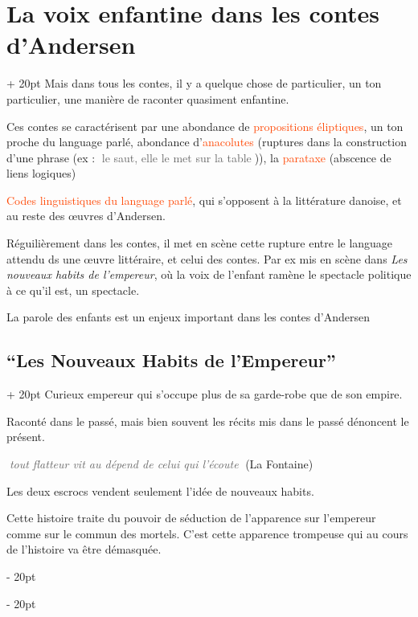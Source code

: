 \documentclass[a4paper, 12pt, twoside]{article}
\renewcommand{\emph}{\textcolor{ff4500}}
\newcommand{\simplecit}[1]{\guillemotleft$\;$#1$\;$\guillemotright}
\newcommand{\cit}[1]{\simplecit{\textcolor{656565}{#1}}}
\newcommand{\quo}[1]{\cit{\it #1}}
\newcommand{\ind}[1][20pt]{\advance\leftskip + #1}
\newcommand{\deind}[1][20pt]{\advance\leftskip - #1}
\newenvironment{indt}[2][20pt]{#2 \par \ind[#1]}{\par \deind} %
\begin{document}
\begin{indt}{\section{La voix enfantine dans les contes d'Andersen}}
        Mais dans tous les contes, il y a quelque chose de particulier, un ton particulier, une manière de raconter quasiment enfantine.
        
        Ces contes se caractérisent par une abondance de \emph{propositions éliptiques}, un ton proche du language parlé, abondance d'\emph{anacolutes} (ruptures dans la construction d'une phrase (ex : \cit{le saut, elle le met sur la table})), la \emph{parataxe} (abscence de liens logiques)
        
        \emph{Codes linguistiques du language parlé}, qui s'opposent à la littérature danoise, et au reste des \oe uvres d'Andersen.
        
        
        Réguilièrement dans les contes, il met en scène cette rupture entre le language attendu ds une \oe uvre littéraire, et celui des contes.
        Par ex mis en scène dans \textit{Les nouveaux habits de l'empereur}, où la voix de l'enfant ramène le spectacle politique à ce qu'il est, un spectacle.
        
        La parole des enfants est un enjeux important dans les contes d'Andersen
        
        \vspace{12pt}
        
        \begin{indt}{\subsection{``Les Nouveaux Habits de l'Empereur''}}
            Curieux empereur qui s'occupe plus de sa garde-robe que de son empire.
            
            Raconté dans le passé, mais bien souvent les récits mis dans le passé dénoncent le présent.
            
            
            \quo{tout flatteur vit au dépend de celui qui l'écoute} (La Fontaine)
            
            Les deux escrocs vendent seulement l'idée de nouveaux habits.
            
            Cette histoire traite du pouvoir de séduction de l'apparence sur l'empereur comme sur le commun des mortels. C'est cette apparence trompeuse qui au cours de l'histoire va être démasquée.
            

\end{indt}
\end{indt}
\end{document}
